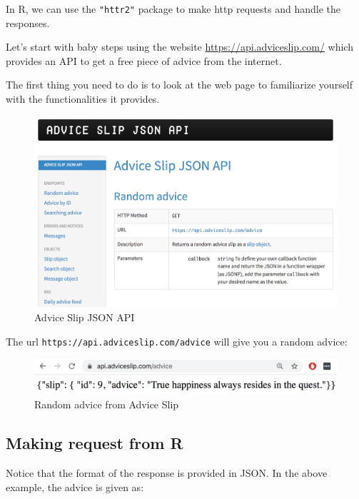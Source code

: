 \documentclass[
]{book}
\begin{document}
In R, we can use the \texttt{"httr2"} package to make http requests and handle the
responses.

Let's start with baby steps using the website \url{https://api.adviceslip.com/}
which provides an API to get a free piece of advice from the internet.

The first thing you need to do is to look at the web page to familiarize
yourself with the functionalities it provides.

\begin{figure}

{\centering \includegraphics[width=0.75\linewidth]{images/api/advice-slip} 

}

\caption{Advice Slip JSON API}\label{fig:unnamed-chunk-113}
\end{figure}

The url \texttt{https://api.adviceslip.com/advice} will give you a random advice:

\begin{figure}

{\centering \includegraphics[width=0.75\linewidth]{images/api/advice-slip-happiness} 

}

\caption{Random advice from Advice Slip}\label{fig:unnamed-chunk-114}
\end{figure}

\hypertarget{making-request-from-r}{%
\subsection{Making request from R}\label{making-request-from-r}}

Notice that the format of the response is provided in JSON. In the above
example, the advice is given as:
\end{document}
